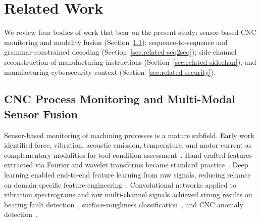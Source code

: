 \documentclass[sensors,article,submit,moreauthors,pdftex]{Definitions/mdpi}
\begin{document}
\section{Related Work}
\label{sec:related}

We review four bodies of work that bear on the present study: sensor-based CNC monitoring and modality fusion (Section~\ref{sec:related-cnc}); sequence-to-sequence and grammar-constrained decoding (Section~\ref{sec:related-seq2seq}); side-channel reconstruction of manufacturing instructions (Section~\ref{sec:related-sidechan}); and manufacturing cybersecurity context (Section~\ref{sec:related-security}).

\subsection{CNC Process Monitoring and Multi-Modal Sensor Fusion}
\label{sec:related-cnc}

Sensor-based monitoring of machining processes is a mature subfield. Early work identified force, vibration, acoustic emission, temperature, and motor current as complementary modalities for tool-condition assessment~\cite{teti2010advanced}. Hand-crafted features extracted via Fourier and wavelet transforms became standard practice~\cite{zhu2009wavelet,mohanraj2020tool}. Deep learning enabled end-to-end feature learning from raw signals, reducing reliance on domain-specific feature engineering~\cite{wang2018deep,zhao2019machine}. Convolutional networks applied to vibration spectrograms and raw multi-channel signals achieved strong results on bearing fault detection~\cite{janssens2016convolutional}, surface-roughness classification~\cite{bhandari2021comparative,stathatos2024cnn}, and CNC anomaly detection~\cite{coelho2024anomaly}.
\end{document}

